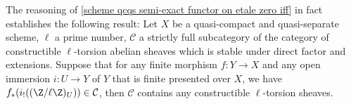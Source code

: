 \begin{remark}
The reasoning of \cref{scheme qcqs semi-exact functor on etale zero iff} in fact establishes the following result: Let $X$ be a quasi-compact and quasi-separate scheme, $\ell$ a prime number, $\mathcal{C}$ a strictly full subcategory of the category of constructible $\ell$-torsion abelian sheaves which is stable under direct factor and extensions. Suppose that for any finite morphism $f:Y\to X$ and any open immersion $i:U\to Y$ of $Y$ that is finite presented over $X$, we have $f_*(i_!((\Z/\ell\Z)_U))\in\mathcal{C}$, then $\mathcal{C}$ contains any constructible $\ell$-torsion sheaves.
\end{remark}


